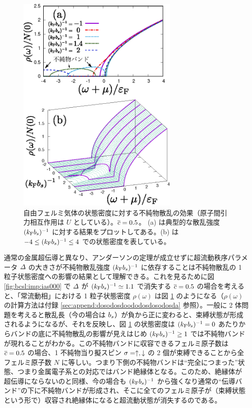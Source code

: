 \label{sec:bcsl:dos-imp}



\begin{figure}[t]
\centering
\includegraphics[width=80mm]{eps/normal-dos-c0500-2.eps}
\caption{自由フェルミ気体の状態密度に対する不純物散乱の効果（原子間引力相互作用は $U$ としている）。$\overline{c}=0.5$。 (a) は典型的な散乱強度 $(k_{\text{F}} b_s)^{-1}$ に対する結果をプロットしてある。(b) は $-4 \le (k_{\text{F}} b_s)^{-1} \le 4$ での状態密度を表している。}
\label{fig:bcsl:imp:ndosc0500}
\end{figure}


通常の金属超伝導と異なり、アンダーソンの定理が成立せずに超流動秩序パラメータ $\varDelta$ の大きさが不純物散乱強度 $(k_{\text{F}} b_s)^{-1}$ に依存することは不純物散乱の 1 粒子状態密度への影響の結果として理解できる。これを見るために図 \ref{fig:bcsl:imp:ias000} で $\varDelta$ が $(k_{\text{F}} b_s)^{-1} \simeq 1.1$ で消失する $\overline{c}=0.5$ の場合を考えると、「常流動相」における 1 粒子状態密度 $\rho(\omega)$ は図 \ref{fig:bcsl:imp:ndosc0500} のようになる（$\rho(\omega)$ の計算方法は付録 \ref{sec:append:dosodosdoododosdosodosda} 参照）。一般に 2 体問題を考えると散乱長（今の場合は $b_s$）が負から正に変わると、束縛状態が形成されるようになるが、それを反映し、図 \ref{fig:bcsl:imp:ndosc0500} の状態密度は $(k_{\text{F}} b_s)^{-1}=0$ あたりからバンドの底に不純物散乱の影響が見えはじめ $(k_{\text{F}} b_s)^{-1}\geq 1$ では不純物バンドが現れることがわかる。この不純物バンドに収容できるフェルミ原子数は $\overline{c}=0.5$ の場合、1 不純物当り擬スピン $\sigma=\uparrow, \downarrow$ の 2 個が束縛できることから全フェルミ原子数 $N$ に等しい。つまり下側の不純物バンドは“完全につまった”状態、つまり金属電子系との対応ではバンド絶縁体となる。このため、絶縁体が超伝導にならないのと同様、今の場合も $(k_{\text{F}} b_s)^{-1}$ から強くなり通常の“伝導バンド”の下に不純物バンドが形成され、そこに全てのフェルミ原子が（束縛状態という形で）収容され絶縁体になると超流動状態が消失するのである。


